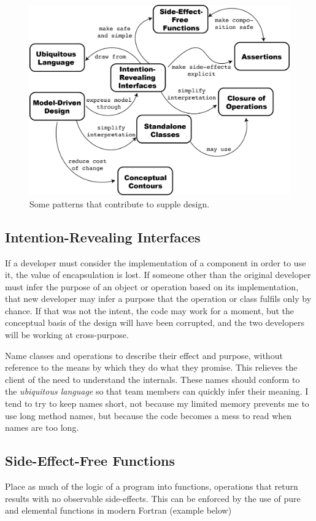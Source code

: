 \documentclass[a4paper,11pt]{article}
\begin{document}
\begin{figure}
\includegraphics[keepaspectratio=true,scale=0.6]{./SuppleDesign/SuppleDesign}
\caption{Some patterns that contribute to supple design.}
\end{figure}

\subsection{Intention-Revealing Interfaces}
If a developer must consider the implementation of a component in order to use it, the value of encapsulation is lost. If someone other than the original developer must infer the purpose of an object or operation based on its implementation, that new developer may infer a purpose that the operation or class fulfils only by chance. If that was not the intent, the code may work for a moment, but the conceptual basis of the design will have been corrupted, and the two developers will be working at cross-purpose.

Name classes and operations to describe their effect and purpose, without reference to the means by which they do what they promise. This relieves the client of the need to understand the internals. These names should conform to the \textit{ubiquitous language} so that team members can quickly infer their meaning. I tend to try to keep names short, not because my limited memory prevents me to use long method names, but because the code becomes a mess to read when names are too long.

\subsection{Side-Effect-Free Functions}
Place as much of the logic of a program into functions, operations that return results with no observable side-effects. This can be enforced by the use of pure and elemental functions in modern Fortran (example below)
\end{document}
